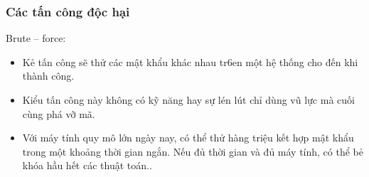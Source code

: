 \documentclass{beamer}
\begin{document}
\begin{frame}
\frametitle{Các tấn công độc hại}
    \begin{block}{Brute – force:}
         \begin{itemize}
    \item Kẻ tấn công sẽ thử các mật khẩu khác nhau tr6en một hệ thống cho đến khi thành công. 
    \item Kiểu tấn công này không có kỹ năng hay sự lén lút chỉ dùng vũ lực mà cuối cùng phá vỡ mã.
    \item Với máy tính quy mô lớn ngày nay, có thể thử hàng triệu kết hợp mật khẩu trong một khoảng thời gian ngắn. Nếu đủ thời gian và đủ máy tính, có thể bẻ khóa hầu hết các thuật toán..
\end{itemize}
    \end{block}
\end{frame}
\end{document}
